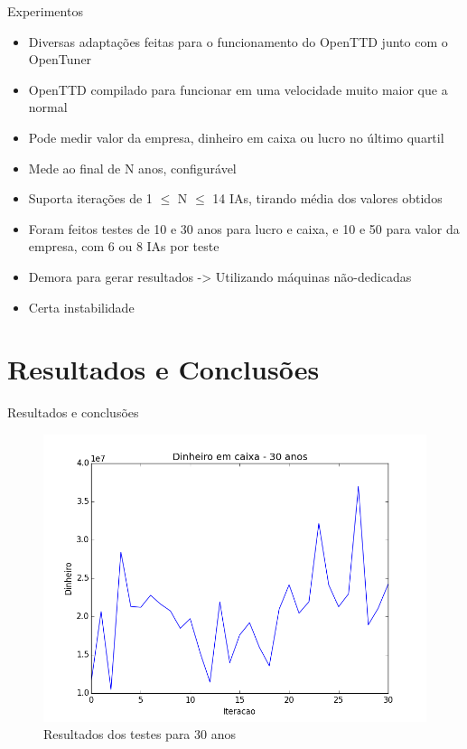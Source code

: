 \documentclass[10pt]{beamer}
\begin{document}
\begin{frame}{Experimentos}
	\begin{itemize}
	\item Diversas adaptações feitas para o funcionamento do OpenTTD junto com o OpenTuner \\
	\item OpenTTD compilado para funcionar em uma velocidade muito maior que a normal\\
	\item Pode medir valor da empresa, dinheiro em caixa ou lucro no último quartil\\
	\item Mede ao final de N anos, configurável\\
	\item Suporta iterações de 1 $\leq$ N $\leq$ 14 IAs, tirando média dos valores obtidos\\
	\item Foram feitos testes de 10 e 30 anos para lucro e caixa, e 10 e 50 para valor da empresa, com 6 ou 8 IAs por teste\\
	\item Demora para gerar resultados -> Utilizando máquinas não-dedicadas\\
	\item Certa instabilidade
	\end{itemize}
\end{frame}

\section{Resultados e Conclusões}

\begin{frame}{Resultados e conclusões}
	\begin{figure}
		\centering
		\includegraphics[width=1\linewidth]{money-30yrs}
		\caption{Resultados dos testes para 30 anos}
		\label{fig:money-30yrs}
	\end{figure}
	
\end{frame}
\end{document}
